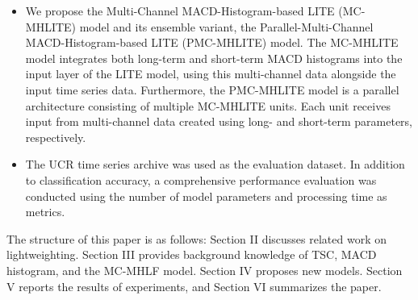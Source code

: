 \documentclass[conference]{IEEEtran}
\begin{document}
\begin{itemize}
\item We propose the Multi-Channel MACD-Histogram-based LITE (MC-MHLITE) model and its ensemble variant, the Parallel-Multi-Channel MACD-Histogram-based LITE (PMC-MHLITE) model. The MC-MHLITE model integrates both long-term and short-term MACD histograms into the input layer of the LITE model, using this multi-channel data alongside the input time series data. Furthermore, the PMC-MHLITE model is a parallel architecture consisting of multiple MC-MHLITE units. Each unit receives input from multi-channel data created using long- and short-term parameters, respectively.

\item The UCR time series archive \cite{8894743} was used as the evaluation dataset. In addition to classification accuracy, a comprehensive performance evaluation was conducted using the number of model parameters and processing time as metrics.
\end{itemize}

The structure of this paper is as follows: Section II discusses related work on lightweighting. Section III provides background knowledge of TSC, MACD histogram, and the MC-MHLF model. Section IV proposes new models. Section V reports the results of experiments, and Section VI summarizes the paper.
\end{document}
